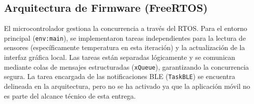 \documentclass[letterpaper,11pt]{article}
\begin{document}
\subsection{Arquitectura de Firmware (FreeRTOS)}
El microcontrolador gestiona la concurrencia a través del RTOS. Para el entorno principal (\texttt{env:main}), se implementaron tareas independientes para la lectura de sensores (específicamente temperatura en esta iteración) y la actualización de la interfaz gráfica local. Las tareas están separadas lógicamente y se comunican mediante colas de mensajes estructuradas (\texttt{xQueue}), garantizando la concurrencia segura. La tarea encargada de las notificaciones BLE (\texttt{TaskBLE}) se encuentra delineada en la arquitectura, pero no se ha activado ya que la aplicación móvil no es parte del alcance técnico de esta entrega.
\end{document}
